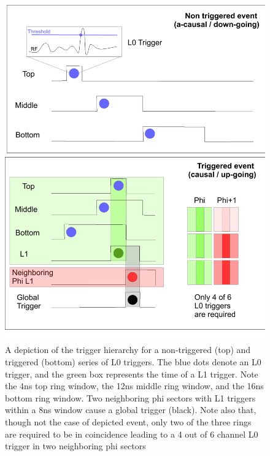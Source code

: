 \begin{figure}
	\centering
	\includegraphics[height=0.8\textheight]{figures/triggerHeirarchy}
	\caption{A depiction of the trigger hierarchy for a non-triggered (top) and triggered (bottom) series of L0 triggers.  The blue dots denote an L0 trigger, and the green box represents the time of a L1  trigger.  Note the 4ns top ring window, the 12ns middle ring window, and the 16ns bottom ring window.  Two neighboring phi sectors with L1 triggers within a 8ns window cause a global trigger (black).  Note also that, though not the case of depicted event, only two of the three rings are required to be in coincidence leading to a 4 out of 6 channel L0 trigger in two neighboring phi sectors}
	\label{fig:trigPattern}
\end{figure}
		
